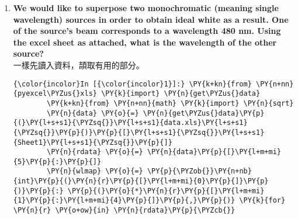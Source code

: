 \documentclass[12pt, a4paper]{article}
\begin{document}
\begin{enumerate}[label={\bf (\alph*)}, leftmargin=0pt]
    \begin{Verbatim}[commandchars=\\\{\}]
{\color{incolor}In [{\color{incolor}9}]:} \PY{n}{x}\PY{p}{,} \PY{n}{y} \PY{o}{=} \PY{n}{xtot}\PY{o}{/}\PY{n}{sm}\PY{p}{,} \PY{n}{ytot}\PY{o}{/}\PY{n}{sm}
\end{Verbatim}

    \begin{Verbatim}[commandchars=\\\{\}]
{\color{incolor}In [{\color{incolor}10}]:} \PY{l+s+s1}{\PYZsq{}}\PY{l+s+s1}{x = }\PY{l+s+si}{\PYZpc{}.6f}\PY{l+s+s1}{, y = }\PY{l+s+si}{\PYZpc{}.6f}\PY{l+s+s1}{\PYZsq{}} \PY{o}{\PYZpc{}} \PY{p}{(}\PY{n}{x}\PY{p}{,} \PY{n}{y}\PY{p}{)}
\end{Verbatim}

            \begin{Verbatim}[commandchars=\\\{\}]
{\color{outcolor}Out[{\color{outcolor}10}]:} 'x = 0.312712, y = 0.329008'
\end{Verbatim}

    因此 \[ x \approx 0.312712, \quad y \approx 0.329008. \]
    和 Wiki \footnote{\texttt{https://en.wikipedia.org/wiki/Illuminant\_D65\#Definition}} 上查到的似乎差不多。

  \item {\bf We would like to superpose two monochromatic (meaning single wavelength) sources in order 
      to obtain ideal white as a result. One of the source’s beam corresponds to a wavelength 480 nm. 
      Using the excel sheet as attached, what is the wavelength of the other source?} \\

    一樣先讀入資料，頡取有用的部分。
    \begin{Verbatim}[commandchars=\\\{\}]
{\color{incolor}In [{\color{incolor}1}]:} \PY{k+kn}{from} \PY{n+nn}{pyexcel\PYZus{}xls} \PY{k}{import} \PY{n}{get\PYZus{}data}
        \PY{k+kn}{from} \PY{n+nn}{math} \PY{k}{import} \PY{n}{sqrt}
        \PY{n}{data} \PY{o}{=} \PY{n}{get\PYZus{}data}\PY{p}{(}\PY{l+s+s1}{\PYZsq{}}\PY{l+s+s1}{data.xls}\PY{l+s+s1}{\PYZsq{}}\PY{p}{)}\PY{p}{[}\PY{l+s+s1}{\PYZsq{}}\PY{l+s+s1}{Sheet1}\PY{l+s+s1}{\PYZsq{}}\PY{p}{]}
        \PY{n}{rdata} \PY{o}{=} \PY{n}{data}\PY{p}{[}\PY{l+m+mi}{5}\PY{p}{:}\PY{p}{]}
        \PY{n}{wlmap} \PY{o}{=} \PY{p}{\PYZob{}}\PY{n+nb}{int}\PY{p}{(}\PY{n}{r}\PY{p}{[}\PY{l+m+mi}{0}\PY{p}{]}\PY{p}{)}\PY{p}{:} \PY{p}{(}\PY{o}{*}\PY{n}{r}\PY{p}{[}\PY{l+m+mi}{1}\PY{p}{:}\PY{l+m+mi}{4}\PY{p}{]}\PY{p}{,}\PY{p}{)} \PY{k}{for} \PY{n}{r} \PY{o+ow}{in} \PY{n}{rdata}\PY{p}{\PYZcb{}}
\end{Verbatim}


\end{enumerate}
\end{document}
